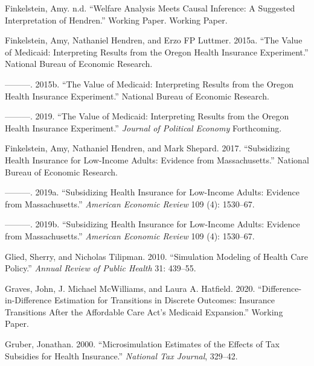 \documentclass[
  10pt,
]{article}
\begin{document}
\leavevmode\hypertarget{ref-finkelsteinWelfareAnalysisMeetsa}{}%
Finkelstein, Amy. n.d. ``Welfare Analysis Meets Causal Inference: A
Suggested Interpretation of Hendren.'' Working Paper. Working Paper.

\leavevmode\hypertarget{ref-finkelsteinValueMedicaidInterpreting2015a}{}%
Finkelstein, Amy, Nathaniel Hendren, and Erzo FP Luttmer. 2015a. ``The
Value of Medicaid: Interpreting Results from the Oregon Health Insurance
Experiment.'' National Bureau of Economic Research.

\leavevmode\hypertarget{ref-FinkelsteinValueMedicaidInterpreting2015}{}%
---------. 2015b. ``The Value of Medicaid: Interpreting Results from the
Oregon Health Insurance Experiment.'' National Bureau of Economic
Research.

\leavevmode\hypertarget{ref-finkelstein_value_2019}{}%
---------. 2019. ``The Value of Medicaid: Interpreting Results from the
Oregon Health Insurance Experiment.'' \emph{Journal of Political
Economy} Forthcoming.

\leavevmode\hypertarget{ref-FinkelsteinSubsidizinghealthinsurance2017}{}%
Finkelstein, Amy, Nathaniel Hendren, and Mark Shepard. 2017.
``Subsidizing Health Insurance for Low-Income Adults: Evidence from
Massachusetts.'' National Bureau of Economic Research.

\leavevmode\hypertarget{ref-finkelsteinSubsidizingHealthInsurance2019}{}%
---------. 2019a. ``Subsidizing Health Insurance for Low-Income Adults:
Evidence from Massachusetts.'' \emph{American Economic Review} 109 (4):
1530--67.

\leavevmode\hypertarget{ref-finkelstein_subsidizing_2019}{}%
---------. 2019b. ``Subsidizing Health Insurance for Low-Income Adults:
Evidence from Massachusetts.'' \emph{American Economic Review} 109 (4):
1530--67.

\leavevmode\hypertarget{ref-GliedSimulationmodelinghealth2010}{}%
Glied, Sherry, and Nicholas Tilipman. 2010. ``Simulation Modeling of
Health Care Policy.'' \emph{Annual Review of Public Health} 31: 439--55.

\leavevmode\hypertarget{ref-graves_differenceindifference_2020}{}%
Graves, John, J. Michael McWilliams, and Laura A. Hatfield. 2020.
``Difference-in-Difference Estimation for Transitions in Discrete
Outcomes: Insurance Transitions After the Affordable Care Act's Medicaid
Expansion.'' Working Paper.

\leavevmode\hypertarget{ref-GruberMicrosimulationestimateseffects2000}{}%
Gruber, Jonathan. 2000. ``Microsimulation Estimates of the Effects of
Tax Subsidies for Health Insurance.'' \emph{National Tax Journal},
329--42.
\end{document}
